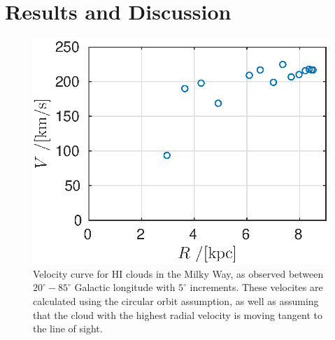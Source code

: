 \documentclass[11pt,a4paper, twocolumn,
swedish, english %
]{article}
\begin{document}
\section{Results and Discussion}
\begin{figure}\centering
\includegraphics[width=1\linewidth]{rotation_curve.eps}
\caption{Velocity curve for HI clouds in the Milky Way, as observed
  between $20^\circ{-}85^\circ$ Galactic longitude with $5^\circ$
  increments. These velocites are calculated using the circular orbit
  assumption, as well as assuming that the cloud with the highest
  radial velocity is moving tangent to the line of sight. }
\label{fig:rot}
\end{figure}
\end{document}

